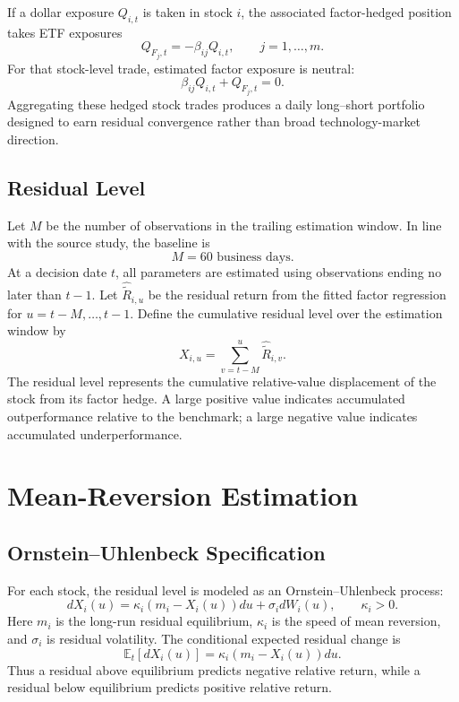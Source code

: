 \documentclass[11pt]{article}
\begin{document}
If a dollar exposure $Q_{i,t}$ is taken in stock $i$, the associated
factor-hedged position takes ETF exposures
\[
    Q_{F_j,t} = -\beta_{ij}Q_{i,t},
    \qquad j=1,\ldots,m.
\]
For that stock-level trade, estimated factor exposure is neutral:
\[
    \beta_{ij}Q_{i,t} + Q_{F_j,t} = 0.
\]
Aggregating these hedged stock trades produces a daily long--short portfolio
designed to earn residual convergence rather than broad technology-market
direction.

\subsection{Residual Level}

Let $M$ be the number of observations in the trailing estimation window. In
line with the source study, the baseline is
\[
    M = 60 \text{ business days}.
\]
At a decision date $t$, all parameters are estimated using observations ending
no later than $t-1$. Let $\widehat{\widetilde{R}}_{i,u}$ be the residual return
from the fitted factor regression for $u=t-M,\ldots,t-1$. Define the cumulative
residual level over the estimation window by
\[
    X_{i,u}
    =
    \sum_{v=t-M}^{u}\widehat{\widetilde{R}}_{i,v}.
\]
The residual level represents the cumulative relative-value displacement of
the stock from its factor hedge. A large positive value indicates accumulated
outperformance relative to the benchmark; a large negative value indicates
accumulated underperformance.

\section{Mean-Reversion Estimation}

\subsection{Ornstein--Uhlenbeck Specification}

For each stock, the residual level is modeled as an
Ornstein--Uhlenbeck process:
\[
    dX_i(u)
    =
    \kappa_i\left(m_i-X_i(u)\right)du
    +
    \sigma_i dW_i(u),
    \qquad \kappa_i>0.
\]
Here $m_i$ is the long-run residual equilibrium,
$\kappa_i$ is the speed of mean reversion, and $\sigma_i$ is residual
volatility. The conditional expected residual change is
\[
    \mathbb{E}_t[dX_i(u)]
    =
    \kappa_i\left(m_i-X_i(u)\right)du.
\]
Thus a residual above equilibrium predicts negative relative return, while a
residual below equilibrium predicts positive relative return.
\end{document}
